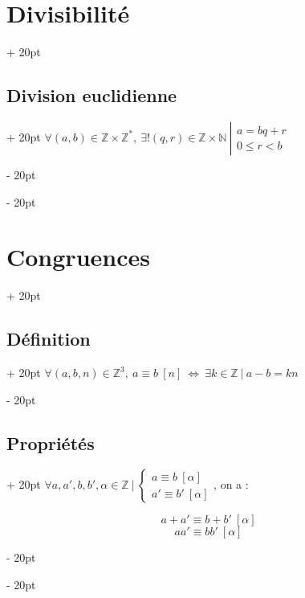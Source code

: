 \documentclass[a4paper, 12pt, twoside]{article}
\newcommand{\N}{\mathbb{N}} %
\newcommand{\Z}{\mathbb{Z}} %
\newcommand{\ssi}{\ \Leftrightarrow \ }
\newcommand{\eqsys}[2]{\begin{cases} #1 \\ #2 \end{cases}}
\renewcommand{\le}{\leqslant}
\newcommand{\ind}[1][20pt]{\advance\leftskip + #1}
\newcommand{\deind}[1][20pt]{\advance\leftskip - #1}
\newenvironment{indt}[2][20pt]{#2 \par \ind[#1]}{\par \deind} %
\begin{document}
\begin{indt}{\section{Divisibilité}}
        \vspace{6pt}
        
        \begin{indt}{\subsection{Division euclidienne}}
            $
                \forall (a, b) \in \Z \times \Z^*,\
                \exists! (q, r) \in \Z \times \N\
                \left|
                \begin{array}{l}
                    a = bq + r
                    \\
                    0 \le r < b
                \end{array}
                \right.
            $
        \end{indt}
        
    \end{indt}
    
    \vspace{12pt}
    
    \begin{indt}{\section{Congruences}}
        
        \begin{indt}{\subsection{Définition}}
            $\forall (a, b, n) \in \Z^3,\ a \equiv b\ [n] \ssi \exists k \in \Z\ |\ a - b = kn$
        \end{indt}
        
        \vspace{6pt}
        
        \begin{indt}{\subsection{Propriétés}}
            $\forall a, a', b, b', \alpha \in \Z\ |\ \eqsys{a \equiv b\ [\alpha]}{a' \equiv b'\ [\alpha]}$, on a :
            
            \[ a + a' \equiv b + b'\ [\alpha] \]
            \[ aa' \equiv bb'\ [\alpha] \]
        \end{indt}
        
    \end{indt}
    
\end{document}
